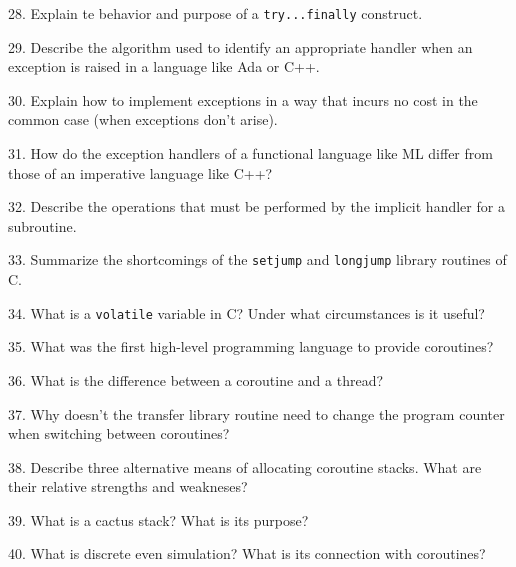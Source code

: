 \filbreak
\vskip 1cm

28. Explain te behavior and purpose of a {\tt try...finally} construct.

\filbreak
\vskip 1cm

29. Describe the algorithm used to identify an appropriate handler when an exception is raised in a language like Ada or C++.

\filbreak
\vskip 1cm

30. Explain how to implement exceptions in a way that incurs no cost in the common case (when exceptions don't arise).

\filbreak
\vskip 1cm

31. How do the exception handlers of a functional language like ML differ from those of an imperative language like C++?

\filbreak
\vskip 1cm

32. Describe the operations that must be performed by the implicit handler for a subroutine.

\filbreak
\vskip 1cm

33. Summarize the shortcomings of the {\tt setjump} and {\tt longjump} library routines of C.

\filbreak
\vskip 1cm

34. What is a {\tt volatile} variable in C? Under what circumstances is it useful?

\filbreak
\vskip 1cm

35. What was the first high-level programming language to provide coroutines?

\filbreak
\vskip 1cm

36. What is the difference between a coroutine and a thread?

\filbreak
\vskip 1cm

37. Why doesn't the transfer library routine need to change the program counter when switching between coroutines?

\filbreak
\vskip 1cm

38. Describe three alternative means of allocating coroutine stacks. What are their relative strengths and weakneses?

\filbreak
\vskip 1cm

39. What is a cactus stack? What is its purpose?

\filbreak
\vskip 1cm

40. What is discrete even simulation? What is its connection with coroutines?

\filbreak
\vskip 1cm

